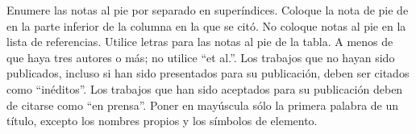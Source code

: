     Enumere las notas al pie por separado en superíndices. Coloque la nota de pie de en la parte inferior de la columna en la que se citó. No coloque notas al pie en la lista de referencias. Utilice letras para las notas al pie de la tabla.
    A menos de que haya tres autores o más; no utilice “et al.”. Los trabajos que no hayan sido publicados, incluso si han sido presentados para su publicación, deben ser citados como “inéditos”. Los trabajos que han sido aceptados para su publicación deben de citarse como “en prensa”. Poner en mayúscula sólo la primera palabra de un título, excepto los nombres propios y los símbolos de elemento. 
    
    
    
    
    
